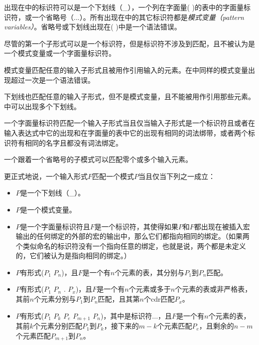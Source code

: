 \begin{entry}{%
\litprotoexpandnoindex{\_}
}
出现在中的标识符可以是一个下划线（{\cf \_}），一个列在字面量{\cf ( \dotsfoo)}的表中的字面量标识符，或一个省略号（{\cf ...}）。所有出现在中的其它标识符都是\textit{模式变量（pattern variables）}。省略号或下划线出现在{\cf ( \dotsfoo)}中是一个语法错误。

尽管的第一个子形式可以是一个标识符，但是标识符不涉及到匹配，且不被认为是一个模式变量或一个字面量标识符。

模式变量匹配任意的输入子形式且被用作引用输入的元素。在中同样的模式变量出现超过一次是一个语法错误。

下划线也匹配任意的输入子形式，但不是模式变量，且不能被用作引用那些元素。中可以出现多个下划线。

一个字面量标识符匹配一个输入子形式当且仅当输入子形式是一个标识符且或者在输入表达式中它的出现和在字面量的表中它的出现有相同的词法绑带，或者两个标识符有相同的名字且都没有词法绑定。

一个跟着一个省略号的子模式可以匹配零个或多个输入元素。

更正式地说，一个输入形式$F$匹配一个模式$P$当且仅当下列之一成立：

\begin{itemize}
\item $P$是一个下划线（{\cf \_}）。

\item $P$是一个模式变量。

\item $P$是一个字面量标识符且$F$是一个标识符，其使得如果$P$和$F$都出现在被插入宏输出的任何绑定的外部的宏的输出中，那么它们都指向相同的绑定。（如果两个类似命名的标识符没有一个指向任意的绑定，也就是说，两个都是未定义的，它们被认为是指向相同的绑定。）

\item $P$有形式{\cf ($P_1$ \dotsfoo{} $P_n$)}，且$F$是一个有$n$个元素的表，其分别与$P_1$到$P_n$匹配。

\item $P$有形式{\cf ($P_1$ \dotsfoo{} $P_n$ . $P_x$)}，且$F$是一个有$n$个元素或多于$n$个元素的表或非严格表，其前$n$个元素分别与$P_1$到$P_n$匹配，且其第$n$个cdr匹配$P_x$。

\item $P$有形式{\cf ($P_1$ \dotsfoo{} $P_k$ $P_e$  $P_{m+1}$ \dotsfoo{} $P_n$)}，其中是标识符{\cf ...}，且$F$是一个有$n$个元素的表，其前$k$个元素分别匹配$P_1$到$P_k$，接下来的$m-k$个元素匹配$P_e$，且剩余的$n-m$个元素匹配$P_{m+1}$到$P_n$。


\end{itemize}
\end{entry}
